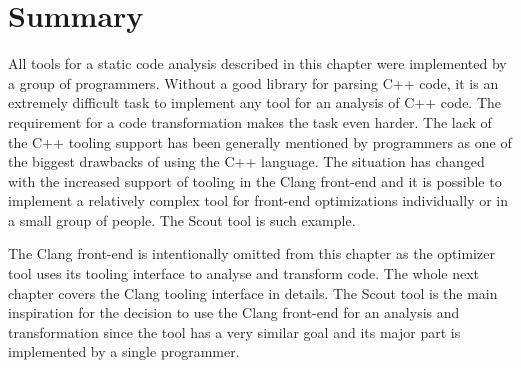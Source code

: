 \section{Summary}
All tools for a static code analysis described in this chapter were implemented by a group of programmers. Without a good library for parsing C++ code, it is an extremely difficult task to implement any tool for an analysis of C++ code. The requirement for a code transformation makes the task even harder. The lack of the C++ tooling support has been generally mentioned by programmers as one of the biggest drawbacks of using the C++ language. The situation has changed with the increased support of tooling in the Clang front-end and it is possible to implement a relatively complex tool for front-end optimizations individually or in a small group of people. The Scout tool is such example.

The Clang front-end is intentionally omitted from this chapter as the optimizer tool uses its tooling interface to analyse and transform code. The whole next chapter covers the Clang tooling interface in details. The Scout tool is the main inspiration for the decision to use the Clang front-end for an analysis and transformation since the tool has a very similar goal and its major part is implemented by a single programmer.